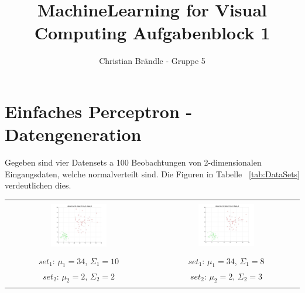 \documentclass[]{report}
\title{MachineLearning for Visual Computing Aufgabenblock 1}
\author{Christian Br\"andle - Gruppe 5}
\begin{document}
\maketitle


\chapter{Einfaches Perceptron - Datengeneration}

Gegeben sind vier Datensets a 100 Beobachtungen von 2-dimensionalen Eingangsdaten, welche normalverteilt sind. Die Figuren in Tabelle ~\ref{tab:DataSets} verdeutlichen dies.


\begin{table}[h]
\begin{tabular}{| c | c |}
\hline
 & \\
\includegraphics[width=0.4\textwidth]{./images/DataSet_100.jpg} & \includegraphics[width=0.4\textwidth]{./images/DataSet_200.jpg} \\
 & \\
 $set_{1}$: $\mu_1=34$, $\Sigma_1=10$ & $set_{1}$: $\mu_1=34$, $\Sigma_1=8$ \\
 $set_{2}$: $\mu_2=2$, $\Sigma_2=2$ & $set_{2}$: $\mu_2=2$, $\Sigma_2=3$ \\
\hline
 & \\

\end{tabular}
\end{table}
\end{document}
